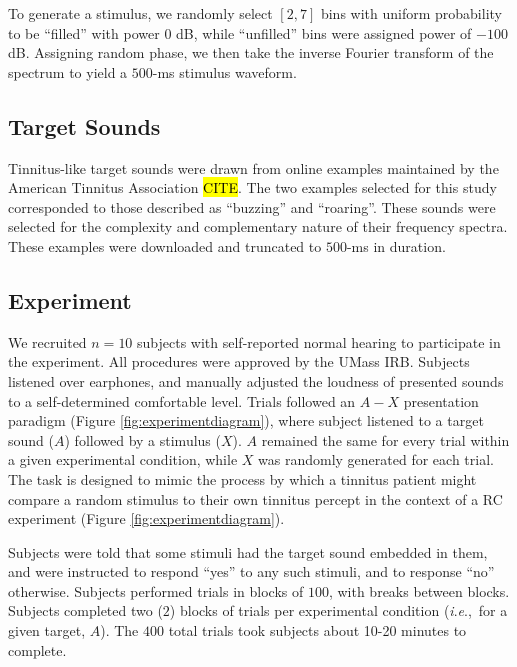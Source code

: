 \documentclass[journal]{IEEEtran}
\newcommand{\ie}{\textit{i}.\textit{e}.,\ }
\begin{document}
To generate a stimulus, we randomly select $[2,7]$ bins with uniform probability to be ``filled'' with power $0$ dB,
while ``unfilled'' bins were assigned power of $-100$ dB. 
Assigning random phase, we then take the inverse Fourier transform of the spectrum to yield a $500$-ms stimulus waveform.

\subsection{Target Sounds}

Tinnitus-like target sounds were drawn from online examples maintained by the American Tinnitus Association \hl{CITE}.
The two examples selected for this study corresponded to those described as ``buzzing'' and ``roaring''.
These sounds were selected for the complexity and complementary nature of their frequency spectra.
These examples were downloaded and truncated to $500$-ms in duration. 

\subsection{Experiment}

We recruited $n=10$ subjects with self-reported normal hearing to participate in the experiment.
All procedures were approved by the UMass IRB.
Subjects listened over earphones, and manually adjusted the loudness of presented sounds to a self-determined comfortable level.
Trials followed an $A-X$ presentation paradigm (Figure \ref{fig:experimentdiagram}),
where subject listened to a target sound ($A$) followed by a stimulus ($X$).
$A$ remained the same for every trial within a given experimental condition,
while $X$ was randomly generated for each trial.
The task is designed to mimic the process by which a tinnitus patient might compare a random stimulus to their own tinnitus percept in the context of a RC experiment
(Figure \ref{fig:experimentdiagram}).

Subjects were told that some stimuli had the target sound embedded in them, and were instructed to respond ``yes'' to any such stimuli, and to response ``no'' otherwise.
Subjects performed trials in blocks of $100$, with breaks between blocks.
Subjects completed two ($2$) blocks of trials per experimental condition (\ie for a given target, $A$).
The $400$ total trials took subjects about 10-20 minutes to complete.
\end{document}
